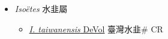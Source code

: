 
  \begin{itemize}
 \item[] \textit{Isoëtes} 水韭屬
                    
  \begin{itemize}
        \item[] \href{http://www.theplantlist.org/tpl1.1/search?q=Isoëtes+taiwanensis}{\textit{I. taiwanensis} DeVol}   臺灣水韭\# CR
  \end{itemize}
  \end{itemize}
